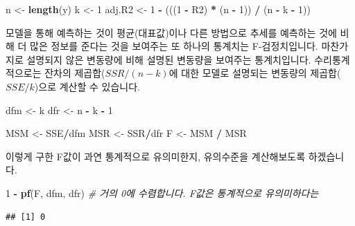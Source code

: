 \documentclass[]{book}
\newenvironment{Shaded}{\begin{snugshade}}{\end{snugshade}}
\newcommand{\CommentTok}[1]{\textcolor[rgb]{0.56,0.35,0.01}{\textit{#1}}}
\newcommand{\DecValTok}[1]{\textcolor[rgb]{0.00,0.00,0.81}{#1}}
\newcommand{\KeywordTok}[1]{\textcolor[rgb]{0.13,0.29,0.53}{\textbf{#1}}}
\newcommand{\NormalTok}[1]{#1}
\newcommand{\OperatorTok}[1]{\textcolor[rgb]{0.81,0.36,0.00}{\textbf{#1}}}
\newcommand{\StringTok}[1]{\textcolor[rgb]{0.31,0.60,0.02}{#1}}
\begin{document}
\begin{itemize}
\begin{itemize}
\begin{Shaded}
\begin{Highlighting}[]
\NormalTok{n <-}\StringTok{ }\KeywordTok{length}\NormalTok{(y)}
\NormalTok{k <-}\StringTok{ }\DecValTok{1}
\NormalTok{adj.R2 <-}\StringTok{ }\DecValTok{1} \OperatorTok{-}\StringTok{ }\NormalTok{(((}\DecValTok{1} \OperatorTok{-}\StringTok{ }\NormalTok{R2) }\OperatorTok{*}\StringTok{ }\NormalTok{(n }\OperatorTok{-}\StringTok{ }\DecValTok{1}\NormalTok{)) }\OperatorTok{/}\StringTok{ }\NormalTok{(n }\OperatorTok{-}\StringTok{ }\NormalTok{k }\OperatorTok{-}\StringTok{ }\DecValTok{1}\NormalTok{))}
\end{Highlighting}
\end{Shaded}

    모델을 통해 예측하는 것이 평균(대표값)이나 다른 방법으로 추세를 예측하는 것에 비해 더 많은 정보를 준다는 것을 보여주는 또 하나의 통계치는 F-검정치입니다. 마찬가지로 설명되지 않은 변동량에 비해 설명된 변동량을 보여주는 통계치입니다. 수리통계적으로는 잔차의 제곱합(\(SSR / (n-k)\)에 대한 모델로 설명되는 변동량의 제곱합(\(SSE / k\))으로 계산할 수 있습니다.
  \end{itemize}
\end{itemize}

\begin{Shaded}
\begin{Highlighting}[]
\NormalTok{dfm <-}\StringTok{ }\NormalTok{k}
\NormalTok{dfr <-}\StringTok{ }\NormalTok{n }\OperatorTok{-}\StringTok{ }\NormalTok{k }\OperatorTok{-}\StringTok{ }\DecValTok{1}

\NormalTok{MSM <-}\StringTok{ }\NormalTok{SSE}\OperatorTok{/}\NormalTok{dfm}
\NormalTok{MSR <-}\StringTok{ }\NormalTok{SSR}\OperatorTok{/}\NormalTok{dfr }
\NormalTok{F <-}\StringTok{ }\NormalTok{MSM }\OperatorTok{/}\StringTok{ }\NormalTok{MSR}
\end{Highlighting}
\end{Shaded}

이렇게 구한 F값이 과연 통계적으로 유의미한지, 유의수준을 계산해보도록 하겠습니다.

\begin{Shaded}
\begin{Highlighting}[]
\DecValTok{1} \OperatorTok{-}\StringTok{ }\KeywordTok{pf}\NormalTok{(F, dfm, dfr) }\CommentTok{# 거의 0에 수렴합니다. F값은 통계적으로 유의미하다는}
\end{Highlighting}
\end{Shaded}

\begin{verbatim}
## [1] 0
\end{verbatim}
\end{document}
